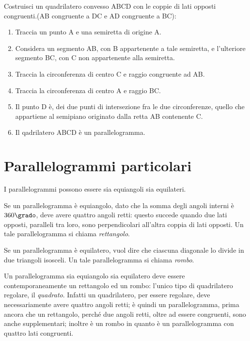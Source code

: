 \begin{procedura}
  Costruisci un quadrilatero convesso ABCD con le coppie di lati opposti 
congruenti.(AB congruente a DC e AD congruente a BC):
  \begin{enumerate} [nosep]
    \item 
    Traccia un punto A e una semiretta di origine A.
    \item 
    Considera un segmento AB, con B appartenente a tale semiretta, e 
l'ulteriore segmento BC, con C non appartenente alla semiretta.
    \item 
    Traccia la circonferenza di centro C e raggio congruente ad AB.
    \item 
    Traccia la circonferenza di centro A e raggio BC.
    
    \item
    Il punto D è, dei due punti di intersezione fra le due circonferenze, 
quello che appartiene al semipiano originato dalla retta AB contenente C.
    \item 
    Il qadrilatero ABCD è un parallelogramma.
\end{enumerate}
\end{procedura}

\section{Parallelogrammi 
  particolari}\label{sect:parallelogrammi_particolari}

I parallelogrammi possono essere sia equiangoli sia equilateri.

\noindent\begin{minipage}{0.7\textwidth}\parindent15pt
  Se un parallelogramma è equiangolo, dato che la somma degli angoli 
  interni è $360\grado$, deve avere quattro angoli retti: questo 
  succede quando due lati opposti, paralleli tra loro, sono 
  perpendicolari all’altra coppia di lati opposti. Un tale 
  parallelogramma si chiama \emph{rettangolo}.
  
  Se un parallelogramma è equilatero, vuol dire che ciascuna diagonale 
  lo divide in due triangoli isosceli. Un tale parallelogramma si 
  chiama \emph{rombo}.
  
  Un parallelogramma sia equiangolo sia equilatero deve essere 
  contemporaneamente un rettangolo ed un rombo: l'unico tipo di 
  quadrilatero regolare, il \emph{quadrato}. Infatti un quadrilatero, 
  per essere regolare, deve necessariamente avere quattro angoli retti; 
  è quindi un parallelogramma, prima ancora che un rettangolo, perché 
  due angoli retti, oltre ad essere congruenti, sono anche 
  supplementari; inoltre è un rombo in quanto è un parallelogramma con 
  quattro lati congruenti.
\end{minipage}\hfil
\begin{minipage}{0.3\textwidth}
  \centering\\~\\
  \centering\\~\\
  \centering
\end{minipage}

